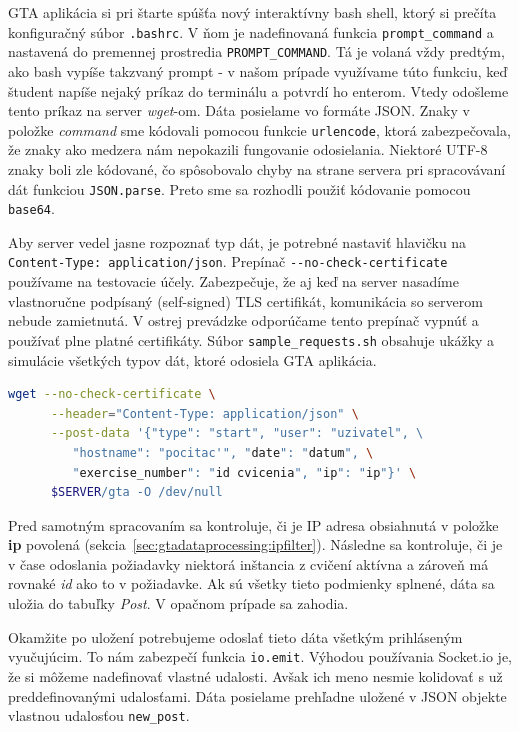 GTA aplikácia si pri štarte spúšťa nový interaktívny bash shell, ktorý si prečíta
konfiguračný súbor \verb'.bashrc'. V ňom je nadefinovaná funkcia \verb'prompt_command'
a nastavená do premennej prostredia \verb'PROMPT_COMMAND'. Tá je volaná vždy predtým,
ako bash vypíše takzvaný prompt - v našom prípade využívame túto funkciu, keď študent
napíše nejaký príkaz do terminálu a potvrdí ho enterom. Vtedy odošleme tento príkaz na
server \textit{wget}-om.
Dáta posielame vo formáte JSON. Znaky v položke \textit{command} sme kódovali
pomocou funkcie \verb'urlencode', ktorá zabezpečovala, že znaky ako medzera nám
nepokazili fungovanie odosielania. Niektoré UTF-8 znaky boli zle kódované, čo
spôsobovalo chyby na strane servera pri spracovávaní dát funkciou \verb'JSON.parse'.
Preto sme sa rozhodli použiť kódovanie pomocou \verb'base64'.

Aby server vedel jasne rozpoznať typ dát,
je potrebné nastaviť hlavičku na \\ \texttt{Content-Type: application/json}.
Prepínač \verb'--no-check-certificate' používame na testovacie účely.
Zabezpečuje, že aj keď na server nasadíme vlastnoručne podpísaný (self-signed)
TLS certifikát, komunikácia so serverom nebude zamietnutá. V ostrej prevádzke
odporúčame tento prepínač vypnúť a používať plne platné certifikáty.
Súbor \texttt{sample\_requests.sh} obsahuje ukážky a simulácie všetkých typov dát,
ktoré odosiela GTA aplikácia.

\begin{lstlisting}[language=Bash]
 wget --no-check-certificate \
      --header="Content-Type: application/json" \
      --post-data '{"type": "start", "user": "uzivatel", \
         "hostname": "pocitac'", "date": "datum", \
         "exercise_number": "id cvicenia", "ip": "ip"}' \
      $SERVER/gta -O /dev/null
\end{lstlisting}

Pred samotným spracovaním sa kontroluje, či je IP adresa
obsiahnutá v položke \textbf{ip} povolená (sekcia~\ref{sec:gtadataprocessing:ipfilter}).
Následne sa kontroluje, či je v čase odoslania požiadavky niektorá inštancia z
cvičení aktívna
a zároveň má rovnaké \textit{id} ako to v požiadavke. Ak sú všetky tieto podmienky
 splnené, dáta sa uložia do tabuľky \textit{Post}. V opačnom prípade sa zahodia.

Okamžite po uložení potrebujeme odoslať tieto dáta všetkým prihláseným vyučujúcim.
To nám zabezpečí funkcia \verb'io.emit'. Výhodou používania Socket.io je, že si môžeme
nadefinovať vlastné udalosti. Avšak ich meno nesmie kolidovať s už preddefinovanými
udalosťami. Dáta posielame prehľadne uložené v JSON objekte vlastnou udalosťou
\verb'new_post'.

